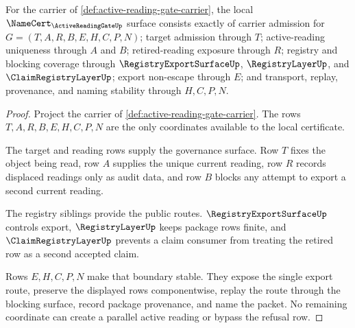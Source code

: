 \begin{theorem}
\label{thm:active-reading-gate-obligation-surface}
For the carrier of \autoref{def:active-reading-gate-carrier}, the local $\NameCert_{\ActiveReadingGateUp}$ surface consists exactly of carrier admission for $G=(T,A,R,B,E,H,C,P,N)$; target admission through $T$; active-reading uniqueness through $A$ and $B$; retired-reading exposure through $R$; registry and blocking coverage through $\RegistryExportSurfaceUp$, $\RegistryLayerUp$, and $\ClaimRegistryLayerUp$; export non-escape through $E$; and transport, replay, provenance, and naming stability through $H,C,P,N$.
\end{theorem}
\begin{proof}
Project the carrier of \autoref{def:active-reading-gate-carrier}. The rows $T,A,R,B,E,H,C,P,N$ are the only coordinates available to the local certificate.

The target and reading rows supply the governance surface. Row $T$ fixes the object being read, row $A$ supplies the unique current reading, row $R$ records displaced readings only as audit data, and row $B$ blocks any attempt to export a second current reading.

The registry siblings provide the public routes. $\RegistryExportSurfaceUp$ controls export, $\RegistryLayerUp$ keeps package rows finite, and $\ClaimRegistryLayerUp$ prevents a claim consumer from treating the retired row as a second accepted claim.

Rows $E,H,C,P,N$ make that boundary stable. They expose the single export route, preserve the displayed rows componentwise, replay the route through the blocking surface, record package provenance, and name the packet. No remaining coordinate can create a parallel active reading or bypass the refusal row.
\end{proof}

